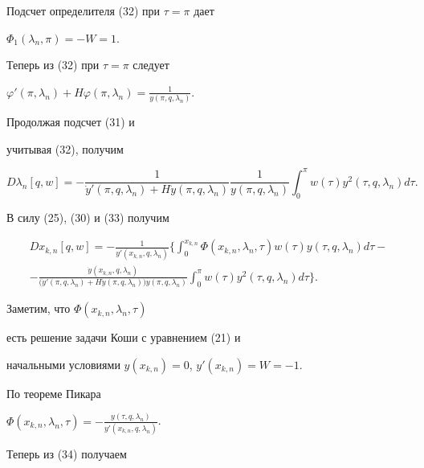 \begin{pf}
 


Подсчет определителя (32) при $\tau=\pi$ дает 


$\Phi_1(\lambda_n,\pi)=-W=1$. 


Теперь из (32) при $\tau=\pi$ следует 


$\varphi'(\pi,\lambda_n)+H\varphi(\pi,\lambda_n)= 


\frac{1}{y(\pi,q,\lambda_n)}$. 


Продолжая подсчет (31) и 


учитывая (32), получим 


\begin{equation} 


D\lambda_n[q,w]=-\frac{1} 


{\Dot y'(\pi,q,\lambda_n)+H\Dot y(\pi,q,\lambda_n)} 


\frac{1}{y(\pi,q,\lambda_n)}\int^\pi_0 


w(\tau)y^2(\tau,q,\lambda_n)d\tau. 


\end{equation} 


В силу (25), (30) и (33) получим 


\begin{multline} 


D x_{k,n}[q,w]=-\frac{1}{y'(x_{k,n},q,\lambda_n)} 


\bigg\{\int^{x_{k,n}}_0\Phi(x_{k,n},\lambda_n,\tau) 


w(\tau)y(\tau,q,\lambda_n)d\tau- \\ 


% 


-\frac{\Dot y(x_{k,n},q,\lambda_n)} 


{\big(\Dot y'(\pi,q,\lambda_n)+H\Dot y(\pi,q,\lambda_n)\big) 


y(\pi,q,\lambda_n)} 


\int^\pi_0 w(\tau)y^2(\tau,q,\lambda_n)d\tau\bigg\}. 


\end{multline} 


Заметим, что $\Phi(x_{k,n},\lambda_n,\tau)$ 


есть решение задачи Коши с уравнением (21) и 


начальными условиями $y(x_{k,n})=0$, $y'(x_{k,n})=W=-1$. 


По теореме Пикара 


$\Phi(x_{k,n},\lambda_n,\tau)=-\frac{y(\tau,q,\lambda_n)} 


{y'(x_{k,n},q,\lambda_n)}$. 


Теперь из (34) получаем 



\end{pf}
